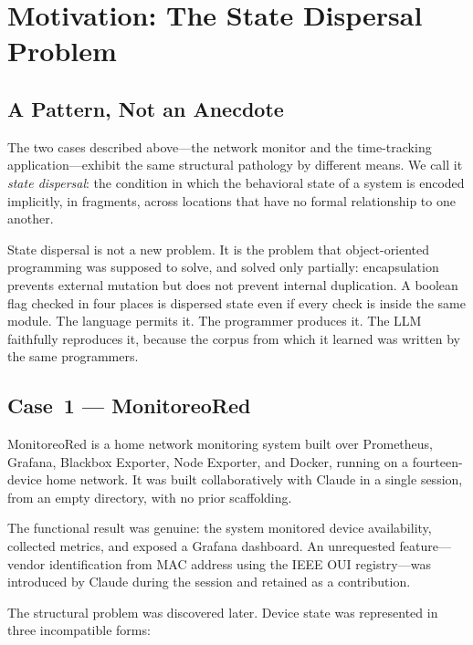 \section{Motivation: The State Dispersal Problem}
\label{sec:motivation}

\subsection{A Pattern, Not an Anecdote}

The two cases described above---the network monitor and the time-tracking
application---exhibit the same structural pathology by different means. We call
it \emph{state dispersal}: the condition in which the behavioral state of a
system is encoded implicitly, in fragments, across locations that have no
formal relationship to one another.

State dispersal is not a new problem. It is the problem that object-oriented
programming was supposed to solve, and solved only partially: encapsulation
prevents external mutation but does not prevent internal duplication. A boolean
flag checked in four places is dispersed state even if every check is inside
the same module. The language permits it. The programmer produces it. The LLM
faithfully reproduces it, because the corpus from which it learned was written
by the same programmers.

\subsection{Case~1 --- MonitoreoRed}
\label{sec:monitoreo}

MonitoreoRed is a home network monitoring system built over Prometheus, Grafana,
Blackbox Exporter, Node Exporter, and Docker, running on a fourteen-device home
network. It was built collaboratively with Claude in a single session, from an
empty directory, with no prior scaffolding.

The functional result was genuine: the system monitored device availability,
collected metrics, and exposed a Grafana dashboard. An unrequested feature---
vendor identification from MAC address using the IEEE OUI registry---was
introduced by Claude during the session and retained as a contribution.

The structural problem was discovered later. Device state was represented in
three incompatible forms:

